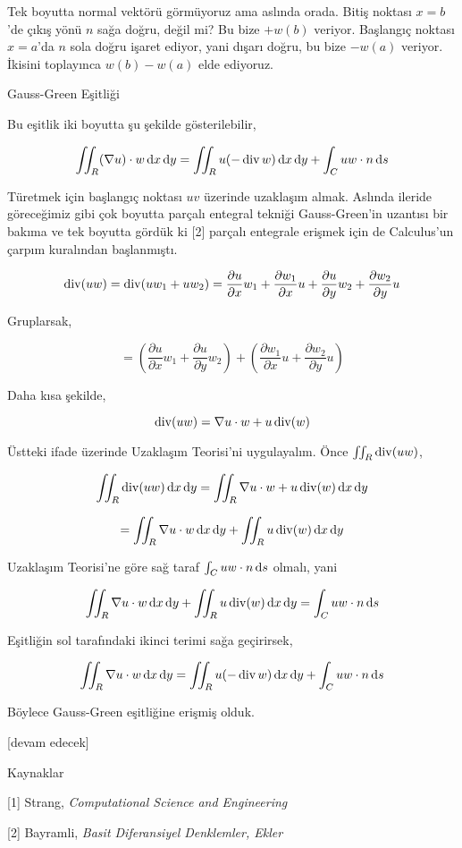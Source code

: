 \documentclass[12pt,fleqn]{article}\usepackage{../../common}
\begin{document}
Tek boyutta normal vektörü görmüyoruz ama aslında orada. Bitiş noktası
$x=b$'de çıkış yönü $n$ sağa doğru, değil mi? Bu bize $+w(b)$ veriyor.
Başlangıç noktası $x=a$'da $n$ sola doğru işaret ediyor, yani dışarı doğru,
bu bize $-w(a)$ veriyor. İkisini toplayınca $w(b) - w(a)$ elde ediyoruz.

Gauss-Green Eşitliği

Bu eşitlik iki boyutta şu şekilde gösterilebilir,

$$
\iint_R (\nabla u ) \cdot w \,\mathrm{d} x \,\mathrm{d} y =
\iint_R u (- \operatorname{div} w) \,\mathrm{d} x \,\mathrm{d} y + \int_C u w \cdot n \,\mathrm{d} s
$$

Türetmek için başlangıç noktası $uv$ üzerinde uzaklaşım almak. Aslında
ileride göreceğimiz gibi çok boyutta parçalı entegral tekniği Gauss-Green'in
uzantısı bir bakıma ve tek boyutta gördük ki [2] parçalı entegrale erişmek
için de Calculus'un çarpım kuralından başlanmıştı.

$$
\operatorname{div} (uw) = \operatorname{div} (u w_1 + u w_2) =
\frac{\partial u}{\partial x} w_1 +
\frac{\partial w_1}{\partial x} u +
\frac{\partial u}{\partial y} w_2 +
\frac{\partial w_2}{\partial y} u 
$$

Gruplarsak,

$$
= \left( 
\frac{\partial u}{\partial x} w_1 +
\frac{\partial u}{\partial y} w_2 \right) +
\left( 
\frac{\partial w_1}{\partial x} u +
\frac{\partial w_2}{\partial y} u \right)
$$

Daha kısa şekilde,

$$
\operatorname{div} (uw) = \nabla u \cdot w + u \operatorname{div}(w)
$$

Üstteki ifade üzerinde Uzaklaşım Teorisi'ni uygulayalım. Önce
$\iint_R \operatorname{div} (uw)$,

$$
\iint_R \operatorname{div} (uw) \,\mathrm{d} x \,\mathrm{d} y= \iint_R \nabla u \cdot w + u \operatorname{div}(w) \,\mathrm{d} x \,\mathrm{d} y
$$

$$
= \iint_R \nabla u \cdot w  \,\mathrm{d} x \,\mathrm{d} y + \iint_R u \operatorname{div}(w) \,\mathrm{d} x \,\mathrm{d} y
$$

Uzaklaşım Teorisi'ne göre sağ taraf $\int_C uw \cdot n \,\mathrm{d} s$ olmalı, yani

$$
\iint_R \nabla u \cdot w  \,\mathrm{d} x \,\mathrm{d} y + \iint_R u \operatorname{div}(w) \,\mathrm{d} x \,\mathrm{d} y = \int_C uw \cdot n \,\mathrm{d} s
$$

Eşitliğin sol tarafındaki ikinci terimi sağa geçirirsek,

$$
\iint_R \nabla u \cdot w  \,\mathrm{d} x \,\mathrm{d} y =
\iint_R u (-\operatorname{div} w) \,\mathrm{d} x \,\mathrm{d} y + \int_C uw \cdot n \,\mathrm{d} s
$$

Böylece Gauss-Green eşitliğine erişmiş olduk.

[devam edecek]

Kaynaklar

[1] Strang, {\em Computational Science and Engineering}

[2] Bayramli, {\em Basit Diferansiyel Denklemler, Ekler}
\end{document}
